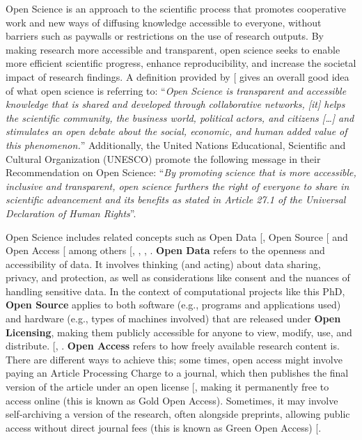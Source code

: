 \documentclass[
  11pt,
  letterpaper,
]{scrreprt}
\begin{document}
Open Science is an approach to the scientific process that promotes
cooperative work and new ways of diffusing knowledge accessible to
everyone, without barriers such as paywalls or restrictions on the use
of research outputs. By making research more accessible and transparent,
open science seeks to enable more efficient scientific progress, enhance
reproducibility, and increase the societal impact of research findings.
A definition provided by {[}\citeproc{ref-vicente-saez2018Open}{357}{]}
gives an overall good idea of what open science is referring to:
``\emph{Open Science is transparent and accessible knowledge that is
shared and developed through collaborative networks, {[}it{]} helps the
scientific community, the business world, political actors, and citizens
{[}\ldots{]} and stimulates an open debate about the social, economic,
and human added value of this phenomenon.}'' Additionally, the United
Nations Educational, Scientific and Cultural Organization (UNESCO)
promote the following message in their Recommendation on Open Science:
``\emph{By promoting science that is more accessible, inclusive and
transparent, open science furthers the right of everyone to share in
scientific advancement and its benefits as stated in Article 27.1 of the
Universal Declaration of Human Rights}''.

Open Science includes related concepts such as Open Data
{[}\citeproc{ref-Whata}{358}{]}, Open Source
{[}\citeproc{ref-Open}{359}{]} and Open Access
{[}\citeproc{ref-suber2012Open}{360}{]} among others
{[},
, ,
\citeproc{ref-parsons2022Communitysourced}{362}{]}. \textbf{Open Data}
refers to the openness and accessibility of data. It involves thinking
(and acting) about data sharing, privacy, and protection, as well as
considerations like consent and the nuances of handling sensitive data.
In the context of computational projects like this PhD, \textbf{Open
Source} applies to both software (e.g., programs and applications used)
and hardware (e.g., types of machines involved) that are released under
\textbf{Open Licensing}, making them publicly accessible for anyone to
view, modify, use, and distribute. {[},
\citeproc{ref-kreutzer2014Open}{364}{]}. \textbf{Open Access} refers to
how freely available research content is. There are different ways to
achieve this; some times, open access might involve paying an Article
Processing Charge to a journal, which then publishes the final version
of the article under an open license
{[}\citeproc{ref-borrego2023Article}{365}{]}, making it permanently free
to access online (this is known as Gold Open Access). Sometimes, it may
involve self-archiving a version of the research, often alongside
preprints, allowing public access without direct journal fees (this is
known as Green Open Access) {[}\citeproc{ref-bjork2014Anatomy}{366}{]}.
\end{document}
